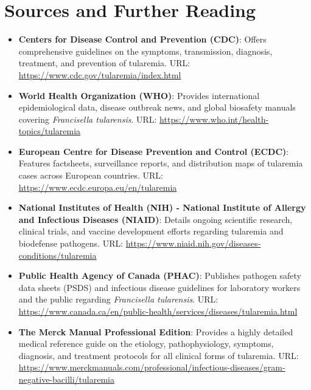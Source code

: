 \section*{Sources and Further Reading}
\begin{itemize}
    \item \textbf{Centers for Disease Control and Prevention (CDC)}: Offers comprehensive guidelines on the symptoms, transmission, diagnosis, treatment, and prevention of tularemia. URL: \url{https://www.cdc.gov/tularemia/index.html}
    \item \textbf{World Health Organization (WHO)}: Provides international epidemiological data, disease outbreak news, and global biosafety manuals covering \textit{Francisella tularensis}. URL: \url{https://www.who.int/health-topics/tularemia}
    \item \textbf{European Centre for Disease Prevention and Control (ECDC)}: Features factsheets, surveillance reports, and distribution maps of tularemia cases across European countries. URL: \url{https://www.ecdc.europa.eu/en/tularemia}
    \item \textbf{National Institutes of Health (NIH) - National Institute of Allergy and Infectious Diseases (NIAID)}: Details ongoing scientific research, clinical trials, and vaccine development efforts regarding tularemia and biodefense pathogens. URL: \url{https://www.niaid.nih.gov/diseases-conditions/tularemia}
    \item \textbf{Public Health Agency of Canada (PHAC)}: Publishes pathogen safety data sheets (PSDS) and infectious disease guidelines for laboratory workers and the public regarding \textit{Francisella tularensis}. URL: \url{https://www.canada.ca/en/public-health/services/diseases/tularemia.html}
    \item \textbf{The Merck Manual Professional Edition}: Provides a highly detailed medical reference guide on the etiology, pathophysiology, symptoms, diagnosis, and treatment protocols for all clinical forms of tularemia. URL: \url{https://www.merckmanuals.com/professional/infectious-diseases/gram-negative-bacilli/tularemia}
\end{itemize}